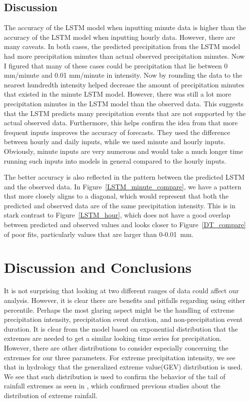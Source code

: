 \documentclass[11pt]{report}
\begin{document}
\subsection{Discussion}
The accuracy of the LSTM model when inputting minute data is higher than the accuracy of the LSTM model when inputting hourly data. However, there are many caveats. In both cases, the predicted precipitation from the LSTM model had more precipitation minutes than actual observed precipitation minutes. Now I figured that many of these cases could be precipitation that lie between 0 mm/minute and 0.01 mm/minute in intensity. Now by rounding the data to the nearest hundredth intensity helped decrease the amount of precipitation minutes that existed in the minute LSTM model. However, there was still a lot more precipitation minutes in the LSTM model than the observed data. This suggests that the LSTM predicts many precipitation events that are not supported by the actual observed data. 
Furthermore, this helps confirm the idea from \cite{CNN} that more frequent inputs improves the accuracy of forecasts. They used the difference between hourly and daily inputs, while we used minute and hourly inputs. Obviously, minute inputs are very numerous and would take a much longer time running such inputs into models in general compared to the hourly inputs. 

The better accuracy is also reflected in the pattern between the predicted LSTM and the observed data. In Figure~\ref{LSTM_minute_compare}, we have a pattern that more closely aligns to a diagonal, which would represent that both the predicted and observed data are of the same precipitation intensity. This is in stark contrast to Figure~\ref{LSTM_hour}, which does not have a good overlap between predicted and observed values and looks closer to Figure~\ref{DT_compare} of poor fits, particularly values that are larger than 0-0.01~mm. 


\clearpage


\section{Discussion and Conclusions}\label{sec:conclusions}


It is not surprising that looking at two different ranges of data could
affect our analysis. However, it is clear there are benefits and pitfalls
regarding using either percentile. Perhaps the most glaring aspect might
be the handling of extreme precipitation intensity, precipitation event
duration, and non-precipitation event duration. It is clear from the
model based on exponential distribution that the extremes are needed to
get a similar looking time series for precipitation. However, there are
other distributions to consider especially concerning the extremes for
our three parameters. For extreme precipitation intensity, we see that in
hydrology that the generalized extreme value(GEV) distribution is used.
We see that such distribution is used to confirm the behavior of the tail
of rainfall extremes as seen in \cite[]{Hydro_dist}, which confirmed
previous studies about the distribution of extreme rainfall.  
\end{document}
